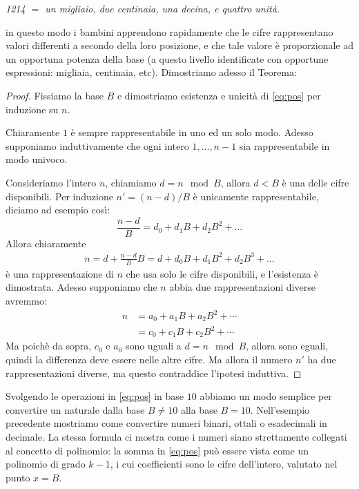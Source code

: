{\it 1214 $ = $ un migliaio, due centinaia, una decina, e quattro unità.}

\noindent in questo modo i bambini apprendono rapidamente che le cifre
rappresentano valori differenti a secondo della loro posizione, e che tale
valore è proporzionale ad un opportuna potenza della base (a questo livello
identificate con opportune espressioni: migliaia, centinaia, etc). Dimostriamo
adesso il Teorema:

\begin{proof}%
Fissiamo la base $B$ e dimostriamo esistenza e unicità di \eqref{eq:pos} per induzione su $n$.

Chiaramente $1$ è sempre rappresentabile in uno ed un solo modo\footnotemark. Adesso supponiamo induttivamente che ogni intero
$1,\ldots,n-1$ sia rappresentabile in modo univoco.

\noindent Consideriamo l'intero $n$, chiamiamo $d = n \mod B$, allora $d < B$ è una delle cifre disponibili. Per induzione $n' = (n-d)/B$ è unicamente rappresentabile, diciamo ad esempio così:
\[ \frac{n-d}{B} = d_0 + d_1 B + d_2 B^2 + \ldots \]
Allora chiaramente
\begin{align*}
n = d + \frac{n-d}{B}B = d + d_0 B + d_1 B^2 + d_2 B^3 + \ldots
\end{align*}
è una rappresentazione di $n$ che usa solo le cifre disponibili, e l'esistenza è dimostrata.
Adesso supponiamo che $n$ abbia due rappresentazioni diverse avremmo:
\begin{align*}
n &= a_0 + a_1B + a_2B^2 + \cdots\\
  &= c_0 + c_1B + c_2B^2 + \cdots
\end{align*}
Ma poichè da sopra, $c_0$ e $a_0$ sono uguali a $d = n \mod B$, allora sono eguali, quindi la differenza deve essere nelle altre cifre. Ma allora il numero $n'$ ha due rappresentazioni diverse, ma questo
contraddice l'ipotesi induttiva.
\end{proof}

Svolgendo le operazioni in \eqref{eq:pos} in base $10$ abbiamo un modo semplice
per convertire un naturale dalla base $B \neq 10$ alla base $B = 10$.
Nell'esempio precedente mostriamo come convertire numeri binari, ottali o
esadecimali in decimale. La stessa formula ci mostra come i numeri siano
strettamente collegati al concetto di polinomio: la somma in \eqref{eq:pos} può
essere vista come un polinomio di grado $k-1$, i cui coefficienti sono le cifre
dell'intero, valutato nel punto $x = B$.

